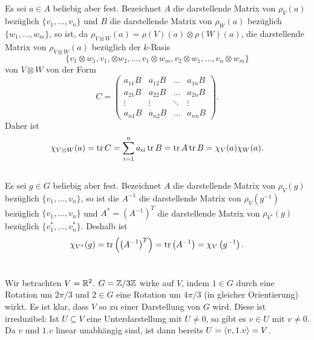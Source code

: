 \documentclass[a4paper,10pt]{article}
\begin{document}
\subsection{}
Es sei $a \in A$ beliebig aber fest. Bezeichnet $A$ die darstellende Matrix von $\rho_V(a)$ bezüglich $\{v_1, \ldots, v_n\}$ und $B$ die darstellende Matrix von $\rho_W(a)$ bezüglich $\{w_1, \ldots, w_m\}$, so ist, da $\rho_{V \otimes W}(a) = \rho(V)(a) \otimes \rho(W)(a)$, die darstellende Matrix von $\rho_{V \otimes W}(a)$ bezüglich der $k$-Basis
\[
 \{v_1 \otimes w_1, v_1, \otimes w_2, \ldots, v_1 \otimes  w_m, v_2 \otimes w_1, \ldots, v_n \otimes w_m\}
\]
von $V \otimes W$ von der Form
\[
 C =
 \begin{pmatrix}
  a_{11} B & a_{12} B & \ldots & a_{1n} B \\
  a_{21} B & a_{22} B & \ldots & a_{2n} B \\
    \vdots &   \vdots & \ddots &   \vdots \\
  a_{n1} B & a_{n2} B & \ldots & a_{nn} B
 \end{pmatrix}.
\]
Daher ist
\[
 \chi_{V \otimes W}(a) = \operatorname{tr} C = \sum_{i=1}^n a_{ii} \operatorname{tr}{B} = \operatorname{tr} A \operatorname{tr} B = \chi_V(a) \chi_W(a).
\]


\subsection{}
Es sei $g \in G$ beliebig aber fest. Bezeichnet $A$ die darstellende Matrix von $\rho_V(g)$ bezüglich $\{v_1, \ldots, v_n\}$, so ist die $A^{-1}$ die darstellende Matrix von $\rho_V\left(g^{-1}\right)$ bezüglich $\{v_1, \ldots, v_n\}$ und $A^* = (A^{-1})^T$ die darstellende Matrix von $\rho_{V^*}(g)$ bezüglich $\{v_1^*, \ldots, v_n^*\}$. Deshalb ist
\[
 \chi_{V^*}(g) = \operatorname{tr}\left(\left(A^{-1}\right)^T\right) = \operatorname{tr}\left( A^{-1} \right) = \chi_V\left(g^{-1}\right).
\]





\section{}


\subsection{}
Wir betrachten $V = \mathbb{R}^2$. $G = \mathbb{Z}/3\mathbb{Z}$ wirke auf $V$, indem $1 \in G$ durch eine Rotation um $2\pi/3$ und $2 \in G$ eine Rotation um $4\pi/3$ (in gleicher Orientierung) wirkt. Es ist klar, dass $V$ so zu einer Darstellung von $G$ wird. Diese ist irreduzibel: Ist $U \subseteq V$ eine Unterdarstellung mit $U \neq 0$, so gibt es $v \in U$ mit $v \neq 0$. Da $v$ und $1.v$ linear unabhängig sind, ist dann bereits $U = \left\langle v,1.v \right\rangle = V$.
\end{document}
